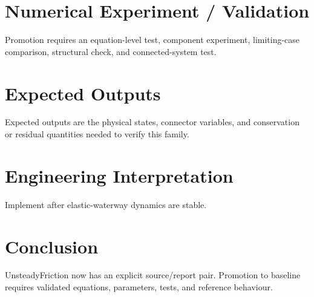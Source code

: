 \documentclass[10pt,a4paper]{article}
\begin{document}
\section{Numerical Experiment / Validation}Promotion requires an equation-level test, component experiment, limiting-case comparison, structural check, and connected-system test.
\section{Expected Outputs}Expected outputs are the physical states, connector variables, and conservation or residual quantities needed to verify this family.
\section{Engineering Interpretation}Implement after elastic-waterway dynamics are stable.
\section*{Conclusion}UnsteadyFriction now has an explicit source/report pair. Promotion to baseline requires validated equations, parameters, tests, and reference behaviour.
\end{document}
